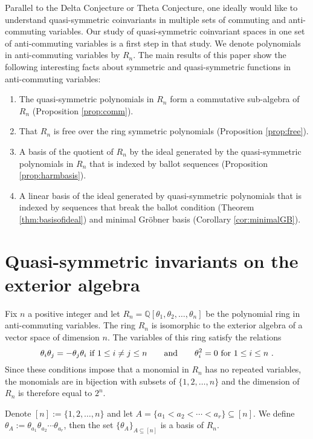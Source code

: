 \documentclass[11pt]{amsart}
\theoremstyle{definition}
\numberwithin{equation}{section}
\begin{document}
Parallel to the Delta Conjecture or Theta Conjecture, one ideally would like to understand quasi-symmetric coinvariants in multiple sets of commuting and anti-commuting variables.
Our study of quasi-symmetric coinvariant spaces in one set of anti-commuting variables is a first step in that study.  We denote polynomials in anti-commuting variables by $R_n$. The main results of this paper show the following interesting facts about symmetric and quasi-symmetric functions in anti-commuting variables:
\begin{enumerate}
\item The quasi-symmetric polynomials in $R_n$ form a commutative sub-algebra of $R_n$ (Proposition \ref{prop:comm}).
\item That $R_n$ is free over the ring symmetric polynomials (Proposition \ref{prop:free}).
\item A basis of the quotient of $R_n$ by the ideal generated by the
quasi-symmetric polynomials in $R_n$ that is indexed by ballot sequences (Proposition \ref{prop:harmbasis}).
\item A linear basis of the ideal generated by quasi-symmetric polynomials
that is indexed by sequences that break the ballot condition
(Theorem \ref{thm:basisofideal}) and minimal Gr\"obner basis (Corollary \ref{cor:minimalGB}).
\end{enumerate}
\section{Quasi-symmetric invariants on the exterior algebra}

Fix $n$ a positive integer and
let $R_n = {\mathbb Q}[\theta_1, \theta_2, \ldots, \theta_n]$ be the
polynomial ring in anti-commuting variables.
The ring $R_n$ is isomorphic to the exterior algebra of a vector
space of dimension $n$.  The variables of this ring satisfy the relations
\[
\theta_i \theta_j = - \theta_j \theta_i \hbox{ if } 1 \leq i \neq j \leq n
\qquad\hbox{and}\qquad \theta_i^2 = 0 \hbox{ for }1 \leq i \leq n~.
\]
Since these conditions impose that a monomial in $R_n$ has no repeated variables,
the monomials are in bijection with subsets of $\{1,2,\ldots, n\}$
and the dimension of $R_n$ is therefore equal to $2^n$.

Denote $[n] := \{1,2, \ldots,n\}$ and
let $A = \{a_1 < a_2 < \cdots < a_r \} \subseteq [n]$.
We define $\theta_A := \theta_{a_1} \theta_{a_2} \cdots \theta_{a_r}$,
then the set $\{ \theta_A \}_{A \subseteq [n]}$ is a basis of $R_n$.
\end{document}
